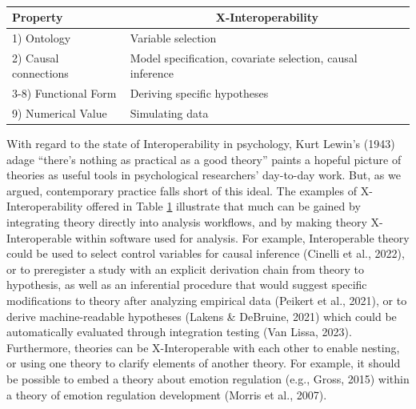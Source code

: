 \documentclass[
  man, noextraspace,floatsintext]{apa7}
\begin{document}
\begin{table}[tbp]

\begin{center}
\begin{threeparttable}

\caption{\label{tab:tabmeehl}}

\begin{tabular}{ll}
\toprule
Property & \multicolumn{1}{c}{X-Interoperability}\\
\midrule
1) Ontology & Variable selection\\
2) Causal connections & Model specification, covariate selection, causal inference\\
3-8) Functional Form & Deriving specific hypotheses\\
9) Numerical Value & Simulating data\\
\bottomrule
\end{tabular}

\end{threeparttable}
\end{center}

\end{table}

With regard to the state of Interoperability in psychology,
Kurt Lewin's (1943) adage ``there's nothing as practical as a good theory'' paints a hopeful picture of theories as useful tools in psychological researchers' day-to-day work.
But, as we argued, contemporary practice falls short of this ideal.
The examples of X-Interoperability offered in Table \ref{tab:tabmeehl} illustrate that much can be gained by integrating theory directly into analysis workflows, and by making theory X-Interoperable within software used for analysis.
For example, Interoperable theory could be used
to select control variables for causal inference (Cinelli et al., 2022),
or to preregister a study with an explicit derivation chain from theory to hypothesis,
as well as an inferential procedure that would suggest specific modifications to theory after analyzing empirical data (Peikert et al., 2021),
or to derive machine-readable hypotheses (Lakens \& DeBruine, 2021) which could be automatically evaluated through integration testing (Van Lissa, 2023).
Furthermore, theories can be X-Interoperable with each other to enable nesting, or using one theory to clarify elements of another theory.
For example, it should be possible to embed a theory about emotion regulation (e.g., Gross, 2015) within a theory of emotion regulation development (Morris et al., 2007).
\end{document}
